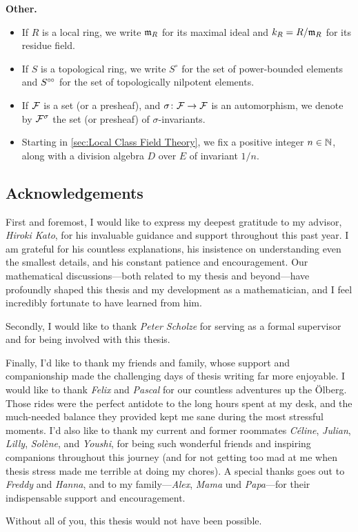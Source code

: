 \documentclass[../main.tex]{subfiles}
\begin{document}
\textbf{Other.}\vspace{-1em}
\begin{itemize}
  \item If $R$ is a local ring, we write $\mathfrak{m}_R$ for its maximal ideal and 
    $k_R = R/\mathfrak{m}_R$ for its residue field. 
  \item If $S$ is a topological ring, we write $S^\circ$ for the set of power-bounded
    elements and $S^{\circ \hspace{-0.5pt} \circ}$ for the set of topologically nilpotent elements.
  \item If $\mathcal{F}$ is a set (or a presheaf), and $\sigma\colon \mathcal{F} \to \mathcal{F}$ is an
    automorphism, we denote by $\mathcal{F}^\sigma$ the set (or presheaf) of 
    $\sigma$-invariants.
  \item Starting in \cref{sec:Local Class Field Theory}, we fix a positive
    integer $n \in \mathbb{N}$, along with a division algebra $D$ over $E$ of invariant $1/n$. 
\end{itemize}


\subsection*{Acknowledgements} %
First and foremost, I would like to express my deepest gratitude to my advisor, \textit{Hiroki Kato}, for his invaluable guidance and support throughout this past year. I am grateful for his countless explanations, his insistence on understanding even the smallest details, and his constant patience and encouragement. Our mathematical discussions—both related to my thesis and beyond—have profoundly shaped this thesis and my development as a mathematician, and I feel incredibly fortunate to have learned from him.

Secondly, I would like to thank \textit{Peter Scholze} for serving as a formal supervisor and for being involved with this thesis. 

Finally, I'd like to thank my friends and family, whose support and companionship made the challenging days of thesis writing far more enjoyable. I would like to thank \textit{Felix} and \textit{Pascal} for our countless adventures up the Ölberg. Those rides were the perfect antidote to the long hours spent at my desk, and the much-needed balance they provided kept me sane during the most stressful moments. I'd also like to thank my current and former roommates \textit{C\'eline}, \textit{Julian}, \textit{Lilly}, \textit{Solène}, and \textit{Youshi}, for being such wonderful friends and inspiring companions throughout this
journey (and for not getting too mad at me when thesis stress made me terrible at doing my chores). A special thanks goes out to \textit{Freddy} and \textit{Hanna}, and to my family—\textit{Alex}, \textit{Mama} und \textit{Papa}—for their indispensable support and encouragement.

Without all of you, this thesis would not have been possible. 

\end{document}
